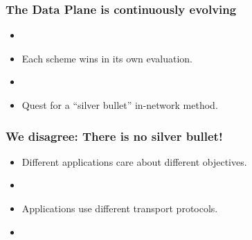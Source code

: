 \begin{Large}
\begin{frame}[plain]
\end{frame}


\begin{frame}[plain]
\frametitle{The Data Plane is continuously evolving}
\begin{itemize}
\item[]
\item Each scheme wins in its own evaluation.
\item[]
\item Quest for a ``silver bullet'' in-network method.
\end{itemize}
\end{frame}

\begin{frame}[plain]
\frametitle{We disagree: There is no silver bullet!}
\begin{itemize}
\item{Different applications care about different objectives.}
\item[]

\item{Applications use different transport protocols.}
\item[]


\end{itemize}
\end{frame}
\end{Large}
